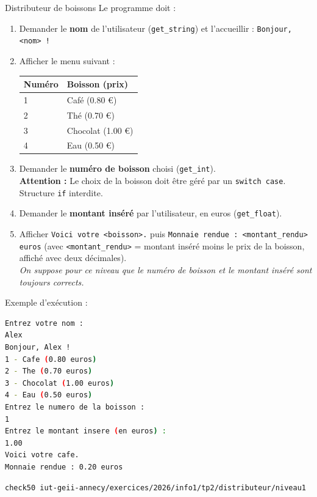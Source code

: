 \begin{UPSTIManipulation}{Distributeur de boissons}
	Le programme doit :
	\begin{enumerate}
		\item Demander le \textbf{nom} de l'utilisateur (\texttt{get\_string}) et l'accueillir : \texttt{Bonjour, <nom> !}
		\item Afficher le menu suivant :
		      \begin{center}
			      \begin{tabular}{|l|l|}
				      \hline
				      Numéro & Boisson (prix)   \\
				      \hline
				      1      & Café (0.80 €)    \\
				      2      & Thé (0.70 €)     \\
				      3      & Chocolat (1.00 €) \\
				      4      & Eau (0.50 €)     \\
				      \hline
			      \end{tabular}
		      \end{center}
		\item Demander le \textbf{numéro de boisson} choisi (\texttt{get\_int}).\\
		      \textbf{Attention :} Le choix de la boisson doit être géré par un \texttt{switch case}. Structure \texttt{if} interdite.
		\item Demander le \textbf{montant inséré} par l'utilisateur, en euros (\texttt{get\_float}).
		\item Afficher \texttt{Voici votre <boisson>.} puis \texttt{Monnaie rendue : <montant\_rendu> euros} (avec \texttt{<montant\_rendu>} = montant inséré moins le prix de la boisson, affiché avec deux décimales).\\
		      \textit{On suppose pour ce niveau que le numéro de boisson et le montant inséré sont toujours corrects.}
	\end{enumerate}

	Exemple d'exécution :
	\begin{lstlisting}[language=bash,style=console]
Entrez votre nom :
Alex
Bonjour, Alex !
1 - Cafe (0.80 euros)
2 - The (0.70 euros)
3 - Chocolat (1.00 euros)
4 - Eau (0.50 euros)
Entrez le numero de la boisson :
1
Entrez le montant insere (en euros) :
1.00
Voici votre cafe.
Monnaie rendue : 0.20 euros
	\end{lstlisting}

	\tcblower
	\begin{lstlisting}[language=bash]
check50 iut-geii-annecy/exercices/2026/info1/tp2/distributeur/niveau1
	\end{lstlisting}
\end{UPSTIManipulation}

